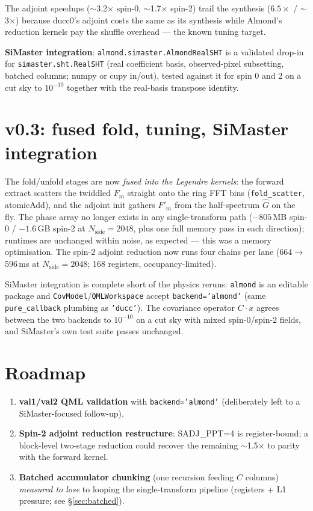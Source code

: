 \documentclass[11pt]{article}
\begin{document}
\begin{center}

\end{center}

\noindent The adjoint speedups ($\sim$3.2$\times$ spin-0, $\sim$1.7$\times$
spin-2) trail the synthesis ($6.5\times$ / $\sim$3$\times$) because ducc0's
adjoint costs the same as its synthesis while Almond's reduction kernels
pay the shuffle overhead --- the known tuning target.

\textbf{SiMaster integration}: \texttt{almond.simaster.AlmondRealSHT} is a
validated drop-in for \texttt{simaster.sht.RealSHT} (real coefficient
basis, observed-pixel subsetting, batched columns; numpy or cupy in/out),
tested against it for spin 0 and 2 on a cut sky to $10^{-10}$ together
with the real-basis transpose identity.

\section{v0.3: fused fold, tuning, SiMaster integration}
\label{sec:v03}

The fold/unfold stages are now \emph{fused into the Legendre kernels}: the
forward extract scatters the twiddled $F_m$ straight onto the ring FFT
bins (\texttt{fold\_scatter}, atomicAdd), and the adjoint init gathers
$F'_m$ from the half-spectrum $\hat G$ on the fly.  The phase array no
longer exists in any single-transform path ($-805$\,MB spin-0 /
$-1.6$\,GB spin-2 at $N_\mathrm{side}=2048$, plus one full memory pass in
each direction); runtimes are unchanged within noise, as expected --- this
was a memory optimisation.  The spin-2 adjoint reduction now runs four
chains per lane (664$\to$596\,ms at $N_\mathrm{side}=2048$; 168 registers,
occupancy-limited).

SiMaster integration is complete short of the physics reruns:
\texttt{almond} is an editable package and
\texttt{CovModel}/\texttt{QMLWorkspace} accept \texttt{backend='almond'}
(same \texttt{pure\_callback} plumbing as \texttt{'ducc'}).  The
covariance operator $C\!\cdot\!x$ agrees between the two backends to
$10^{-10}$ on a cut sky with mixed spin-0/spin-2 fields, and SiMaster's
own test suite passes unchanged.

\section{Roadmap}
\label{sec:future}

\begin{enumerate}
\item \textbf{val1/val2 QML validation} with \texttt{backend='almond'}
  (deliberately left to a SiMaster-focused follow-up).
\item \textbf{Spin-2 adjoint reduction restructure}: SADJ\_PPT=4 is
  register-bound; a block-level two-stage reduction could recover the
  remaining $\sim$1.5$\times$ to parity with the forward kernel.
\item \textbf{Batched accumulator chunking} (one recursion feeding $C$
  columns) \emph{measured to lose} to looping the single-transform
  pipeline (registers + L1 pressure; see \S\ref{sec:batched}).
\end{enumerate}
\end{document}
